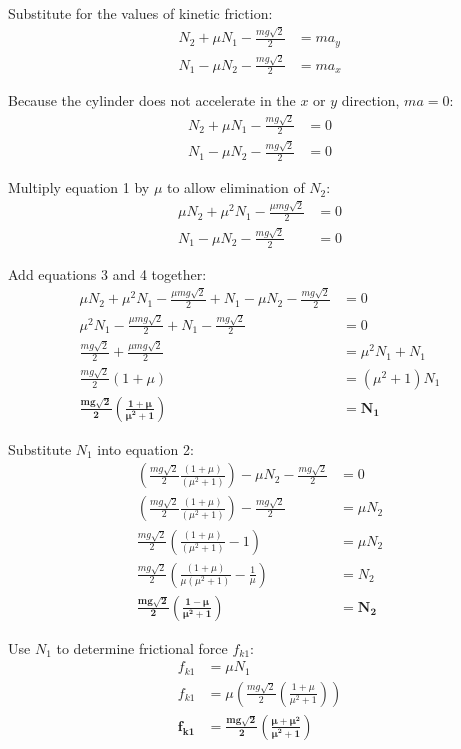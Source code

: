 \documentclass{article}
\begin{document}
Substitute for the values of kinetic friction:
\begin{align*}
    N_{2}+\mu N_{1}-\frac{mg\sqrt{2}}{2}&=ma_{y}\\
    N_{1}-\mu N_{2}-\frac{mg\sqrt{2}}{2}&=ma_{x}
\end{align*}

Because the cylinder does not accelerate in the $x$ or $y$ direction, $ma=0$:
\begin{align}
    N_{2}+\mu N_{1}-\frac{mg\sqrt{2}}{2}&=0\\
    N_{1}-\mu N_{2}-\frac{mg\sqrt{2}}{2}&=0
\end{align}

Multiply equation 1 by $\mu$ to allow elimination of $N_{2}$:
\begin{align}
    \mu N_{2}+\mu^{2} N_{1}-\frac{\mu mg\sqrt{2}}{2}&=0\\
    N_{1}-\mu N_{2}-\frac{mg\sqrt{2}}{2}&=0
\end{align}

Add equations 3 and 4 together:
\begin{align*}
    \mu N_{2}+\mu^{2} N_{1}-\frac{\mu mg\sqrt{2}}{2}+N_{1}-\mu N_{2}-\frac{mg\sqrt{2}}{2}&=0\\
    \mu^{2} N_{1}-\frac{\mu mg\sqrt{2}}{2}+N_{1}-\frac{mg\sqrt{2}}{2}&=0\\
    \frac{mg\sqrt{2}}{2}+\frac{\mu mg\sqrt{2}}{2}&=\mu^{2} N_{1}+N_{1}\\
    \frac{mg\sqrt{2}}{2}(1+\mu)&=(\mu^{2}+1)N_{1}\\
    \bm{\frac{mg\sqrt{2}}{2}\left(\frac{1+\mu}{\mu^{2}+1}\right)}&\bm{=N_{1}}
\end{align*}

Substitute $N_{1}$ into equation 2:
\begin{align*}
    \left(\frac{mg\sqrt{2}}{2}\frac{(1+\mu)}{(\mu^{2}+1)}\right)-\mu N_{2}-\frac{mg\sqrt{2}}{2}&=0\\
    \left(\frac{mg\sqrt{2}}{2}\frac{(1+\mu)}{(\mu^{2}+1)}\right)-\frac{mg\sqrt{2}}{2}&=\mu N_{2}\\
    \frac{mg\sqrt{2}}{2}\left(\frac{(1+\mu)}{(\mu^{2}+1)}-1\right)&=\mu N_{2}\\
    \frac{mg\sqrt{2}}{2}\left(\frac{(1+\mu)}{\mu(\mu^{2}+1)}-\frac{1}{\mu}\right)&=N_{2}\\
    \bm{\frac{mg\sqrt{2}}{2}\left(\frac{1-\mu}{\mu^{2}+1}\right)}&\bm{=N_{2}}
\end{align*}

Use $N_{1}$ to determine frictional force $f_{k1}$:
\begin{align*}
    f_{k1}&=\mu N_{1}\\
    f_{k1}&=\mu \left(\frac{mg\sqrt{2}}{2}\left(\frac{1+\mu}{\mu^{2}+1}\right)\right)\\
    \bm{f_{k1}}&\bm{=\frac{mg\sqrt{2}}{2}\left(\frac{\mu+\mu^{2}}{\mu^{2}+1}\right)}
\end{align*}
\end{document}
